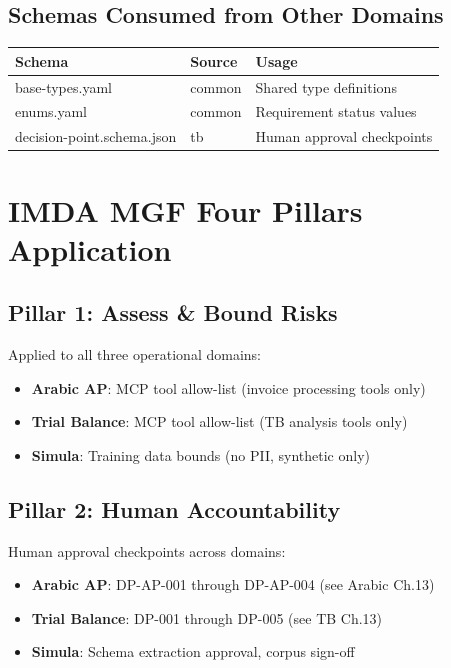 \subsection{Schemas Consumed from Other Domains}

\begin{tabularx}{\linewidth}{@{}l l X@{}}
\toprule
\textbf{Schema} & \textbf{Source} & \textbf{Usage} \\
\midrule
base-types.yaml & common & Shared type definitions \\
enums.yaml & common & Requirement status values \\
decision-point.schema.json & tb & Human approval checkpoints \\
\bottomrule
\end{tabularx}

\section{IMDA MGF Four Pillars Application}
\label{sec:pillar-application}

\subsection{Pillar 1: Assess \& Bound Risks}

Applied to all three operational domains:

\begin{itemize}
  \item \textbf{Arabic AP}: MCP tool allow-list (invoice processing tools only)
  \item \textbf{Trial Balance}: MCP tool allow-list (TB analysis tools only)
  \item \textbf{Simula}: Training data bounds (no PII, synthetic only)
\end{itemize}

\subsection{Pillar 2: Human Accountability}

Human approval checkpoints across domains:

\begin{itemize}
  \item \textbf{Arabic AP}: DP-AP-001 through DP-AP-004 (see Arabic Ch.13)
  \item \textbf{Trial Balance}: DP-001 through DP-005 (see TB Ch.13)
  \item \textbf{Simula}: Schema extraction approval, corpus sign-off
\end{itemize}

